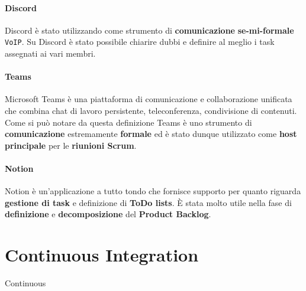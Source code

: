 \paragraph{Discord}
Discord è stato utilizzando come strumento di \textbf{comunicazione} \textbf{se-mi-formale} \texttt{VoIP}. Su Discord è stato possibile chiarire dubbi e definire al meglio i task assegnati ai vari membri.

\paragraph{Teams}
Microsoft Teams è una piattaforma di comunicazione e collaborazione unificata che combina chat di lavoro persistente, teleconferenza, condivisione di contenuti. Come si può notare da questa definizione Teams è uno strumento di \textbf{comunicazione} estremamente \textbf{formale} ed è stato dunque utilizzato come \textbf{host principale} per le \textbf{riunioni Scrum}.

\paragraph{Notion}
Notion è un'applicazione a tutto tondo che fornisce supporto per quanto riguarda \textbf{gestione di task} e definizione di \textbf{ToDo lists}. È stata molto utile nella fase di \textbf{definizione} e \textbf{decomposizione} del \textbf{Product Backlog}.

\section{Continuous Integration}
Continuous